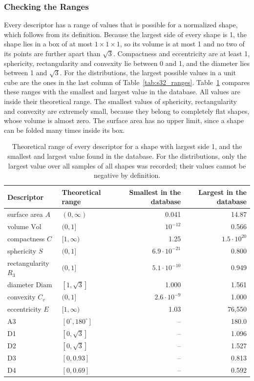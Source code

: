 \documentclass[10pt,a4paper]{article}
\begin{document}
\subsubsection{Checking the Ranges}

Every descriptor has a range of values that is possible for a normalized shape, which follows from its definition. Because the
largest side of every shape is 1, the shape lies in a box of at most $1\times1\times1$, so its volume is at most 1 and no two of
its points are further apart than $\sqrt3$. Compactness and eccentricity are at least 1, sphericity, rectangularity and
convexity lie between 0 and 1, and the diameter lies between 1 and $\sqrt3$. For the distributions, the largest possible
values in a unit cube are the ones in the last column of Table~\ref{tab:s32_ranges}. Table~\ref{tab:s32_theory} compares these
ranges with the smallest and largest value in the database. All values are inside their theoretical range. The smallest
values of sphericity, rectangularity and convexity are extremely small, because they belong to completely flat shapes, whose
volume is almost zero. The surface area has no upper limit, since a shape can be folded many times inside its box.

\begin{table}[htbp]\centering\small
\begin{tabular}{@{}llrr@{}}\toprule
Descriptor & Theoretical range & Smallest in the database & Largest in the database\\\midrule
surface area $A$ & $(0,\infty)$ & 0.041 & 14.87\\
volume $\mathrm{Vol}$ & $(0,1]$ & $10^{-12}$ & 0.566\\
compactness $C$ & $[1,\infty)$ & 1.25 & $1.5\cdot10^{20}$\\
sphericity $S$ & $(0,1]$ & $6.9\cdot10^{-21}$ & 0.800\\
rectangularity $R_3$ & $(0,1]$ & $5.1\cdot10^{-10}$ & 0.949\\
diameter $\mathrm{Diam}$ & $[1,\sqrt3]$ & 1.000 & 1.561\\
convexity $C_v$ & $(0,1]$ & $2.6\cdot10^{-9}$ & 1.000\\
eccentricity $E$ & $[1,\infty)$ & 1.03 & 76,550\\
A3 & $[0^\circ,180^\circ]$ & -- & 180.0\\
D1 & $[0,\sqrt3]$ & -- & 1.096\\
D2 & $[0,\sqrt3]$ & -- & 1.527\\
D3 & $[0,0.93]$ & -- & 0.813\\
D4 & $[0,0.69]$ & -- & 0.592\\
\bottomrule\end{tabular}
\caption{Theoretical range of every descriptor for a shape with largest side 1, and the smallest and largest value found in the
database. For the distributions, only the largest value over all samples of all shapes was recorded; their values cannot be
negative by definition.}
\label{tab:s32_theory}
\end{table}
\end{document}
